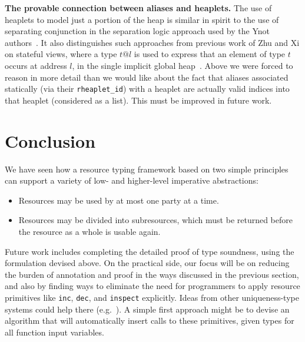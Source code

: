 \documentclass[9pt,natbib]{sigplanconf}
\begin{document}
\textbf{The provable connection between aliases and heaplets.} The use
of heaplets to model just a portion of the heap is similar in spirit
to the use of separating conjunction in the separation logic approach
used by the Ynot authors~\cite{nanevski+08,reynolds02}.  It also
distinguishes such approaches from previous work of Zhu and Xi on
stateful views, where a type $t@l$ is used to express that an element
of type $t$ occurs at address $l$, in the single implicit global
heap~\cite{zhu+05}.  Above we were forced to reason in more detail
than we would like about the fact that aliases associated statically
(via their \texttt{rheaplet\_id}) with a heaplet are actually valid
indices into that heaplet (considered as a list).  This must be
improved in future work.



\section{Conclusion}

We have seen how a resource typing framework based on two simple
principles can support a variety of low- and higher-level imperative
abstractions:
\begin{itemize}
\item Resources may be used by at most one party at a time.
\item Resources may be divided into subresources, which must be
  returned before the resource as a whole is usable again.
\end{itemize}
\noindent Future work includes completing the detailed proof of type
soundness, using the formulation devised above. On the practical side,
our focus will be on reducing the burden of annotation and proof in
the ways discussed in the previous section, and also by finding ways
to eliminate the need for programmers to apply resource primitives
like \texttt{inc}, \texttt{dec}, and \texttt{inspect} explicitly.
Ideas from other uniqueness-type systems could help there
(e.g.~\cite{vries08}). A simple first approach might be to devise an
algorithm that will automatically insert calls to these primitives,
given types for all function input variables.
\end{document}
